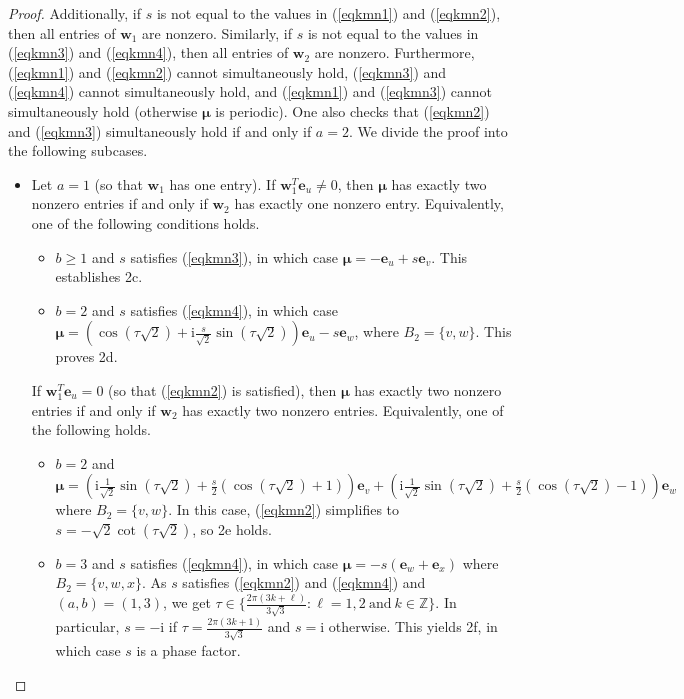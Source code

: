 \documentclass[10pt,a4paper]{amsart}
\def\Z{\mathbb{Z}}
\newcommand{\be}{\mathbf e}
\newcommand{\bmu}{{\boldsymbol{\mu}}}
\newcommand{\bw}{\mathbf w}
\def\ii{\mathrm{i}}
\begin{document}
\begin{proof}
Additionally, if $s$ is not equal to the values in (\ref{eqkmn1}) and (\ref{eqkmn2}), then all entries of $\bw_1$ are nonzero. Similarly, if $s$ is not equal to the values in (\ref{eqkmn3}) and (\ref{eqkmn4}), then all entries of $\bw_2$ are nonzero. Furthermore, (\ref{eqkmn1}) and (\ref{eqkmn2}) cannot simultaneously hold, (\ref{eqkmn3}) and (\ref{eqkmn4}) cannot simultaneously hold, and (\ref{eqkmn1}) and (\ref{eqkmn3}) cannot simultaneously hold (otherwise $\bmu$ is periodic). One also checks that (\ref{eqkmn2}) and (\ref{eqkmn3}) simultaneously hold if and only if $a=2$. We divide the proof into the following subcases.
\begin{itemize}
\item Let $a=1$ (so that $\bw_1$ has one entry). If $\bw_1^T\be_u\neq 0$, then $\bmu$ has exactly two nonzero entries if and only if $\bw_2$ has exactly one nonzero entry. Equivalently, one of the following conditions holds.
\begin{itemize}
\item $b\geq 1$ and $s$ satisfies (\ref{eqkmn3}), in which case $\bmu=-\be_u+s\be_v$. This establishes 2c.
\item $b=2$ and $s$ satisfies (\ref{eqkmn4}), in which case $\bmu=\left(\cos( \tau\sqrt{2})+\ii \frac{s}{\sqrt{2}}\sin(\tau\sqrt{2})\right)\be_u -s\be_w$, where $B_2=\{v,w\}$. This proves 2d.
\end{itemize}
If $\bw_1^T\be_u=0$ (so that (\ref{eqkmn2}) is satisfied), then $\bmu$ has exactly two nonzero entries if and only if $\bw_2$ has exactly two nonzero entries. Equivalently, one of the following holds.
\begin{itemize}
\item $b=2$ and $\bmu=\left(\ii\frac{1}{\sqrt{2}}\sin(\tau\sqrt{2})+\frac{s}{2}(\cos(\tau\sqrt{2})+1)\right)\be_v+\left(\ii\frac{1}{\sqrt{2}}\sin(\tau\sqrt{2})+\frac{s}{2}(\cos(\tau\sqrt{2})-1)\right)\be_w$ where $B_2=\{v,w\}$. In this case, (\ref{eqkmn2}) simplifies to $s=-\sqrt{2}\cot(\tau\sqrt{2})$, so 2e holds.
\item $b=3$ and $s$ satisfies (\ref{eqkmn4}), in which case 
$\bmu=-s(\be_w+\be_x)$ where $B_2=\{v,w,x\}$. As $s$ satisfies (\ref{eqkmn2}) and (\ref{eqkmn4}) and $(a,b)=(1,3)$, we get $\tau\in\big\{\frac{2\pi(3k+\ell)}{3\sqrt{3}}:\ell=1,2\ \text{and}\ k\in\Z\big\}$. In particular, $s=-\ii$ if $\tau=\frac{2\pi(3k+1)}{3\sqrt{3}}$ and $s=\ii$ otherwise. This yields 2f, in which case $s$ is a phase factor.

\end{itemize}
\end{itemize}
\end{proof}
\end{document}
